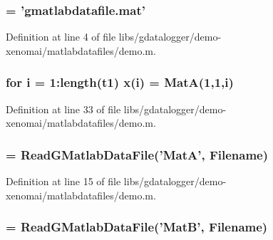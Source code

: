 \subsubsection[{Filename}]{ = '{\bf gmatlabdatafile.mat}'}\label{libs_2gdatalogger_2demo-xenomai_2matlabdatafiles_2demo_8m_abdb1e623b73fdd157f7bfdae4b062a5e}


Definition at line 4 of file libs/gdatalogger/demo-\/xenomai/matlabdatafiles/demo.m.
\subsubsection[{i}]{\setlength{\rightskip}{0pt plus 5cm}for {\bf i} = 1:length({\bf t1}) x({\bf i}) = {\bf MatA}(1,1,{\bf i})}\label{libs_2gdatalogger_2demo-xenomai_2matlabdatafiles_2demo_8m_a6f6ccfcf58b31cb6412107d9d5281426}


Definition at line 33 of file libs/gdatalogger/demo-\/xenomai/matlabdatafiles/demo.m.
\subsubsection[{MatA}]{ = ReadGMatlabDataFile('{\bf MatA}', {\bf Filename})}\label{libs_2gdatalogger_2demo-xenomai_2matlabdatafiles_2demo_8m_a464183ef373ac7e56eaf9fb062575ba3}


Definition at line 15 of file libs/gdatalogger/demo-\/xenomai/matlabdatafiles/demo.m.
\subsubsection[{MatB}]{ = ReadGMatlabDataFile('{\bf MatB}', {\bf Filename})}\label{libs_2gdatalogger_2demo-xenomai_2matlabdatafiles_2demo_8m_a4372bd4a57af0ffd5b030d836a60959f}


